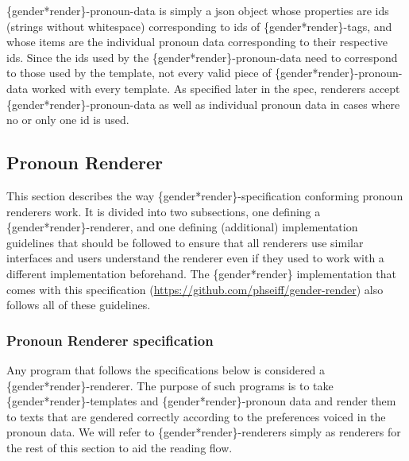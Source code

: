 \documentclass{article}
\begin{document}
    \{gender*render\}-pronoun-data is simply a json object whose properties are ids (strings without whitespace) corresponding to ids of \{gender*render\}-tags, and whose items are the individual pronoun data corresponding to their respective ids.
    Since the ids used by the \{gender*render\}-pronoun-data need to correspond to those used by the template, not every valid piece of \{gender*render\}-pronoun-data worked with every template.
    As specified later in the spec, renderers accept \{gender*render\}-pronoun-data as well as individual pronoun data in cases where no or only one id is used.

    \subsection{Pronoun Renderer}

    This section describes the way \{gender*render\}-specification conforming pronoun renderers work.
    It is divided into two subsections, one defining a \{gender*render\}-renderer, and one defining (additional) implementation guidelines that should be followed to ensure that all renderers use similar interfaces and users understand the renderer even if they used to work with a different implementation beforehand.
    The \{gender*render\} implementation that comes with this specification (\url{https://github.com/phseiff/gender-render}) also follows all of these guidelines.

    \subsubsection{Pronoun Renderer specification}

    Any program that follows the specifications below is considered a \{gender*render\}-renderer.
    The purpose of such programs is to take \{gender*render\}-templates and \{gender*render\}-pronoun data and render them to texts that are gendered correctly according to the preferences voiced in the pronoun data.
    We will refer to \{gender*render\}-renderers simply as renderers for the rest of this section to aid the reading flow.\\
\end{document}
